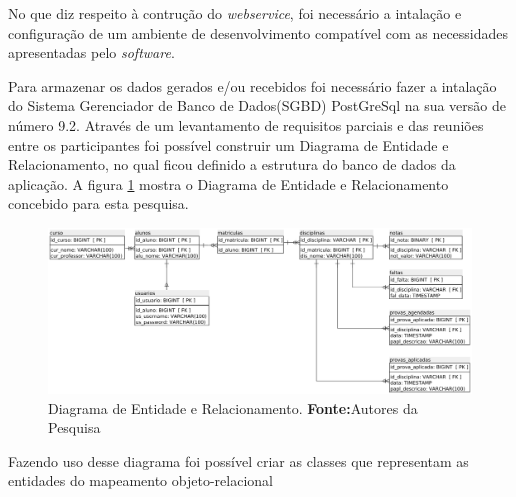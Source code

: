 		\par No que diz respeito à contrução do \textit{webservice}, foi necessário a
	intalação e configuração de um ambiente de desenvolvimento compatível com as
	necessidades apresentadas pelo \textit{software}. 
		
		\par Para armazenar os dados gerados e/ou recebidos foi necessário fazer a
	intalação do Sistema Gerenciador de Banco de Dados(SGBD) PostGreSql na sua
	versão de número 9.2. Através de um levantamento de requisitos parciais e das
	reuniões entre os participantes foi possível construir um Diagrama de Entidade
	e Relacionamento, no qual ficou definido a estrutura do banco de dados da
	aplicação. A figura \ref{fig:exemplo5} mostra o Diagrama de Entidade e
	Relacionamento concebido para esta pesquisa. 

		\begin{figure}[h!]
			\centerline{\includegraphics[scale=0.5]{./imagens/imagem5.png}}
			\caption[Diagrama de Entidade e Relacionamento]{Diagrama de Entidade e
			Relacionamento.
			\textbf{Fonte:}Autores da Pesquisa}
			\label{fig:exemplo5}
		\end{figure}

		\par Fazendo uso desse diagrama foi possível criar as classes  que
	representam as entidades do mapeamento objeto-relacional 
